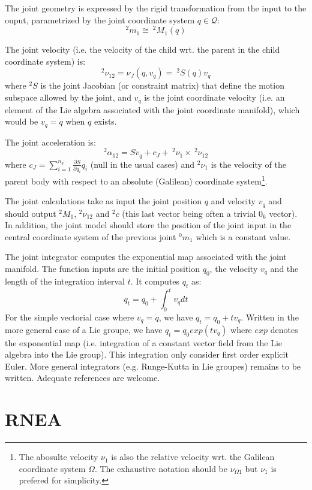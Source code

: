 \documentclass[11pt,twoside,a4paper]{article}
\newcommand{\repr}{\cong}
\newcommand{\dpartial}[2]{\frac{\partial{#1}}{\partial{#2}}}
\begin{document}
The joint geometry is expressed by the rigid transformation from the input to the ouput, parametrized by the joint coordinate system $q \in \mathcal{Q}$:
$$ ^2m_1 \repr \ ^2M_1(q)$$

The joint velocity (i.e. the velocity of the child wrt. the parent in the child coordinate system) is:
$$^2\nu_{12} = \nu_J(q,v_q) = \ ^2S(q) v_q $$
where $^2S$ is the joint Jacobian (or constraint matrix) that define the motion subspace allowed by the joint, and $v_q$ is the joint coordinate velocity (i.e. an element of the Lie algebra associated with the joint coordinate manifold), which would be $v_q=\dot q$ when $\dot q$ exists.

The joint acceleration is:
$$^2\alpha_{12} = S \dot v_q + c_J + \ ^2\nu_{1} \times \ ^2\nu_{12}$$
where $c_J = \sum_{i=1}^{n_q} \dpartial{S}{q_i} \dot q_i$ (null in the usual cases) and $^2\nu_{1}$ is the velocity of the parent body with respect to an absolute (Galilean) coordinate system\footnote{The abosulte velocity $\nu_{1}$ is also the relative velocity wrt. the Galilean coordinate system $\Omega$. The exhaustive notation should be $\nu_{\Omega1}$ but $\nu_1$ is prefered for simplicity.}.

The joint calculations take as input the joint position $q$ and velocity $v_q$ and should output $^2M_1$, $^2\nu_{12}$ and $^2c$ (this last vector being often a trivial $0_6$ vector). In addition, the joint model should store the position of the joint input in the central coordinate system of the previous joint $^0m_1$ which is a constant value.

The joint integrator computes the exponential map associated with the joint manifold. The function inputs are the initial position $q_0$, the velocity $v_q$  and the length of the integration interval $t$. It computes $q_t$ as:
$$ q_t = q_0 + \int_0^t v_q dt$$
For the simple vectorial case where $v_q=\dot q$, we have $q_t=q_0 + t v_q$. Written in the more general case of a Lie groupe, we have $q_t = q_0 exp(t v_q)$ where $exp$ denotes the exponential map (i.e. integration of a constant vector field from the Lie algebra into the Lie group). This integration only consider first order explicit Euler. More general integrators (e.g. Runge-Kutta in Lie groupes) remains to be written. Adequate references are welcome.

\section{RNEA}
\end{document}
